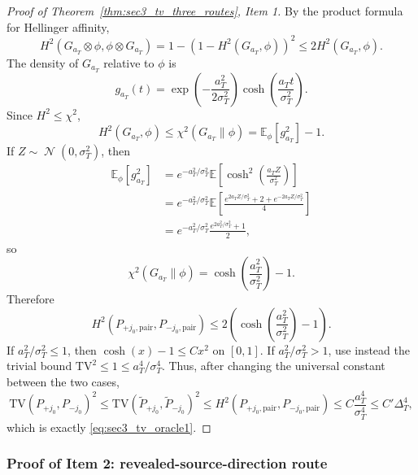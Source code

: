 \documentclass[10pt]{article}
\newcommand{\Ebb}{\mathbb E}
\newcommand{\TV}{\mathrm{TV}}
\DeclareMathOperator{\dnorm}{\mathcal N}
\newcommand{\trg}{T}
\newcommand{\sigmaT}{\sigma_{\trg}}
\newcommand{\DeltaT}{\Delta_{\trg}}
\begin{document}
\begin{proof}[Proof of Theorem~\ref{thm:sec3_tv_three_routes}, Item 1]
By the product formula for Hellinger affinity,
\[
    H^2(G_{a_{\trg}}\otimes\phi,\phi\otimes G_{a_{\trg}})
    =
    1-(1-H^2(G_{a_{\trg}},\phi))^2
    \le
    2H^2(G_{a_{\trg}},\phi).
\]
The density of $G_{a_{\trg}}$ relative to $\phi$ is
\[
    g_{a_{\trg}}(t)=\exp\!\left(-\frac{a_{\trg}^2}{2\sigmaT^2}\right)\cosh\!\left(\frac{a_{\trg}t}{\sigmaT^2}\right).
\]
Since $H^2\le \chi^2$,
\[
    H^2(G_{a_{\trg}},\phi)
    \le
    \chi^2(G_{a_{\trg}}\|\phi)
    =
    \Ebb_\phi[g_{a_{\trg}}^2]-1.
\]
If $Z\sim\dnorm(0,\sigmaT^2)$, then
\begin{align*}
    \Ebb_\phi[g_{a_{\trg}}^2]
    &=
    e^{-a_{\trg}^2/\sigmaT^2}\Ebb\!\left[\cosh^2\!\left(\frac{a_{\trg}Z}{\sigmaT^2}\right)\right]\\
    &=
    e^{-a_{\trg}^2/\sigmaT^2}\Ebb\!\left[\frac{e^{2a_{\trg}Z/\sigmaT^2}+2+e^{-2a_{\trg}Z/\sigmaT^2}}{4}\right]\\
    &=
    e^{-a_{\trg}^2/\sigmaT^2}\frac{e^{2a_{\trg}^2/\sigmaT^2}+1}{2},
\end{align*}
so
\[
    \chi^2(G_{a_{\trg}}\|\phi)=\cosh\!\left(\frac{a_{\trg}^2}{\sigmaT^2}\right)-1.
\]
Therefore
\[
    H^2(P_{+j_0,\mathrm{pair}},P_{-j_0,\mathrm{pair}})
    \le
    2\left(\cosh\!\left(\frac{a_{\trg}^2}{\sigmaT^2}\right)-1\right).
\]
If $a_{\trg}^2/\sigmaT^2\le 1$, then
$\cosh(x)-1\le Cx^2$ on $[0,1]$.  If
$a_{\trg}^2/\sigmaT^2>1$, use instead the trivial bound
$\TV^2\le 1\le a_{\trg}^4/\sigmaT^4$.  Thus, after changing the universal
constant between the two cases,
\[
    \TV(P_{+j_0},P_{-j_0})^2
    \le
    \TV(\widetilde P_{+j_0},\widetilde P_{-j_0})^2
    \le
    H^2(P_{+j_0,\mathrm{pair}},P_{-j_0,\mathrm{pair}})
    \le
    C \frac{a_{\trg}^4}{\sigmaT^4}
    \le
    C'\DeltaT^4,
\]
which is exactly \eqref{eq:sec3_tv_oracle1}.
\end{proof}

\subsubsection{Proof of Item 2: revealed-source-direction route}
\end{document}
